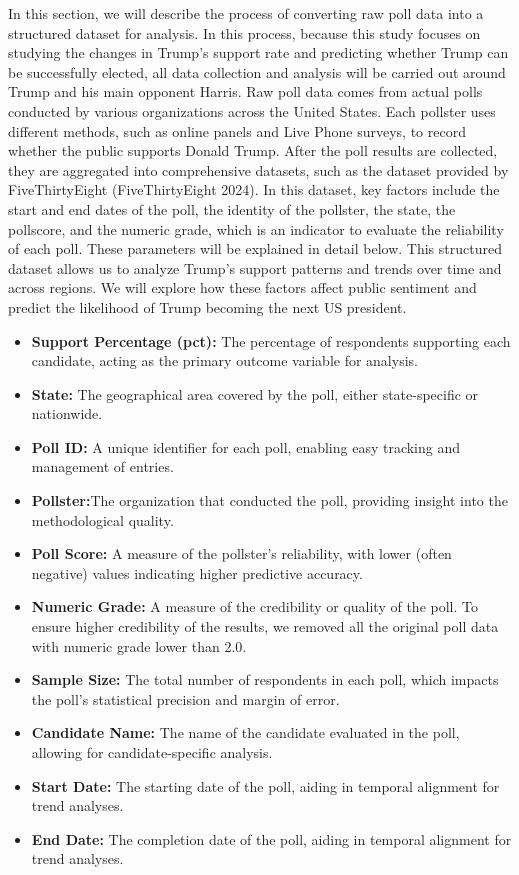 \documentclass[
  letterpaper,
  DIV=11,
  numbers=noendperiod]{scrartcl}
\begin{document}
In this section, we will describe the process of converting raw poll
data into a structured dataset for analysis. In this process, because
this study focuses on studying the changes in Trump's support rate and
predicting whether Trump can be successfully elected, all data
collection and analysis will be carried out around Trump and his main
opponent Harris. Raw poll data comes from actual polls conducted by
various organizations across the United States. Each pollster uses
different methods, such as online panels and Live Phone surveys, to
record whether the public supports Donald Trump. After the poll results
are collected, they are aggregated into comprehensive datasets, such as
the dataset provided by FiveThirtyEight (FiveThirtyEight 2024). In this
dataset, key factors include the start and end dates of the poll, the
identity of the pollster, the state, the pollscore, and the numeric
grade, which is an indicator to evaluate the reliability of each poll.
These parameters will be explained in detail below. This structured
dataset allows us to analyze Trump's support patterns and trends over
time and across regions. We will explore how these factors affect public
sentiment and predict the likelihood of Trump becoming the next US
president.

\begin{itemize}
\item
  \textbf{Support Percentage (pct):} The percentage of respondents
  supporting each candidate, acting as the primary outcome variable for
  analysis.
\item
  \textbf{State:} The geographical area covered by the poll, either
  state-specific or nationwide.
\item
  \textbf{Poll ID:} A unique identifier for each poll, enabling easy
  tracking and management of entries.
\item
  \textbf{Pollster:}The organization that conducted the poll, providing
  insight into the methodological quality.
\item
  \textbf{Poll Score:} A measure of the pollster's reliability, with
  lower (often negative) values indicating higher predictive accuracy.
\item
  \textbf{Numeric Grade:} A measure of the credibility or quality of the
  poll. To ensure higher credibility of the results, we removed all the
  original poll data with numeric grade lower than 2.0.
\item
  \textbf{Sample Size:} The total number of respondents in each poll,
  which impacts the poll's statistical precision and margin of error.
\item
  \textbf{Candidate Name:} The name of the candidate evaluated in the
  poll, allowing for candidate-specific analysis.
\item
  \textbf{Start Date:} The starting date of the poll, aiding in temporal
  alignment for trend analyses.
\item
  \textbf{End Date:} The completion date of the poll, aiding in temporal
  alignment for trend analyses.
\end{itemize}
\end{document}
